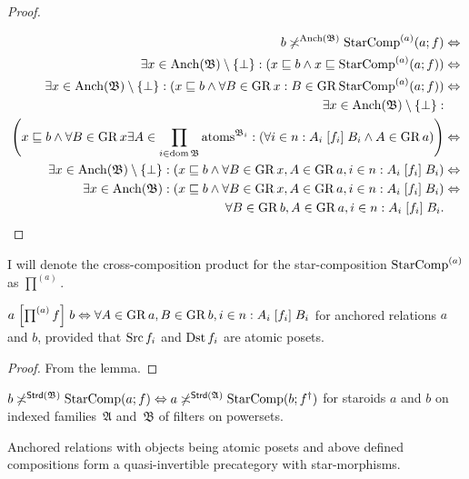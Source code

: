 \begin{proof}
~

\begin{align*}
b\not\asymp^{\operatorname{Anch}(\mathfrak{B})}\operatorname{StarComp}^{(a)}(a;f) & \Leftrightarrow\\
\exists x\in\operatorname{Anch}(\mathfrak{B})\setminus\{\bot\}:(x\sqsubseteq b\wedge x\sqsubseteq\operatorname{StarComp}^{(a)}(a;f)) & \Leftrightarrow\\
\exists x\in\operatorname{Anch}(\mathfrak{B})\setminus\{\bot\}:(x\sqsubseteq b\wedge\forall B\in\operatorname{GR} x:B\in\operatorname{GR}\operatorname{StarComp}^{(a)}(a;f)) & \Leftrightarrow\\
\exists x\in\operatorname{Anch}(\mathfrak{B})\setminus\{\bot\}:\\
\left(x\sqsubseteq b\wedge\forall B\in\operatorname{GR} x\exists A\in\prod_{i\in\operatorname{dom}\mathfrak{B}}\operatorname{atoms}^{\mathfrak{B}_{i}}:\left(\forall i\in n:A_{i}\mathrel{\left[f_{i}\right]}B_{i}\wedge A\in\operatorname{GR} a\right)\right) & \Leftrightarrow\\
\exists x\in\operatorname{Anch}(\mathfrak{B})\setminus\{\bot\}:\left(x\sqsubseteq b\wedge\forall B\in\operatorname{GR} x,A\in\operatorname{GR} a,i\in n:A_{i}\mathrel{\left[f_{i}\right]}B_{i}\right) & \Leftrightarrow\\
\exists x\in\operatorname{Anch}(\mathfrak{B}):\left(x\sqsubseteq b\wedge\forall B\in\operatorname{GR} x,A\in\operatorname{GR} a,i\in n:A_{i}\mathrel{\left[f_{i}\right]}B_{i}\right) & \Leftrightarrow\\
\forall B\in\operatorname{GR} b,A\in\operatorname{GR} a,i\in n:A_{i}\mathrel{\left[f_{i}\right]}B_{i}.
\end{align*}
\end{proof}
\begin{defn}
I will denote the cross-composition product for the star-composition
$\operatorname{StarComp}^{(a)}$ as $\prod^{(a)}$.\end{defn}
\begin{thm}
\label{a-b-cross-prod}$a\mathrel{\left[\prod^{(a)}f\right]}b\Leftrightarrow\forall A\in\operatorname{GR} a,B\in\operatorname{GR} b,i\in n:A_{i}\mathrel{\left[f_{i}\right]}B_{i}$
for anchored relations $a$ and $b$, provided that $\operatorname{Src} f_{i}$
and $\operatorname{Dst} f_{i}$ are atomic posets.\end{thm}
\begin{proof}
From the lemma.\end{proof}
\begin{conjecture}
$b\not\asymp^{\mathsf{Strd}(\mathfrak{B})}\operatorname{StarComp}(a;f)\Leftrightarrow a\not\asymp^{\mathsf{Strd}(\mathfrak{A})}\operatorname{StarComp}(b;f^{\dagger})$
for staroids $a$ and $b$ on indexed families~$\mathfrak{A}$ and~$\mathfrak{B}$
of filters on powersets.\end{conjecture}
\begin{thm}
Anchored relations with objects being atomic posets and above defined
compositions form a quasi-invertible precategory with star-morphisms.\end{thm}
